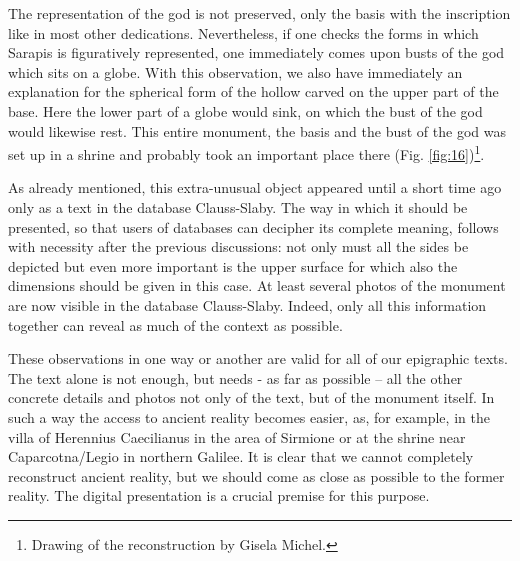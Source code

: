 \documentclass[amsthm,ebook]{saparticle}
\begin{document}
The representation of the god is not preserved, only the basis with the inscription 
like in most other dedications. Nevertheless, if one checks the forms 
in which Sarapis is figuratively represented, one immediately comes upon busts 
of the god which sits on a globe. With this observation, we also have immediately 
an explanation for the spherical form of the hollow carved on the upper part of 
the base. Here the lower part of a globe would sink, on which the bust 
of the god would likewise rest. This entire monument, the basis and the bust of 
the god was set up in a shrine and probably took an important place there (Fig. \ref{fig:16})\footnote{Drawing of the reconstruction by Gisela Michel.}. 

As already mentioned, this extra-unusual object appeared until a short time ago 
only as a text in the database Clauss-Slaby. The way in which it should be presented, 
so that users of databases can decipher its complete meaning, follows with necessity 
after the previous discussions: not only must all the sides be depicted but even 
more important is the upper surface for which also the dimensions should be given 
in this case. At least several photos of the monument are now visible in the database 
Clauss-Slaby. Indeed, only all this information together can reveal as much of 
the context as possible. 

These observations in one way or another are valid for all of our epigraphic texts. 
The text alone is not enough, but needs - as far as possible – all the other 
concrete details and photos not only of the text, but of the monument itself. In 
such a way the access to ancient reality becomes easier, as, for example, in the 
villa of Herennius Caecilianus in the area of Sirmione or at the shrine near Caparcotna/Legio 
in northern Galilee. It is clear that we cannot completely reconstruct ancient 
reality, but we should come as close as possible to the former reality. The digital 
presentation is a crucial premise for this purpose. 
\end{document}
